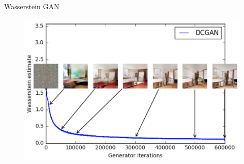 \begin{frame}{Wasserstein GAN}
\begin{minipage}[t]{0.5\columnwidth}
\begin{figure}
		\end{figure}
	\end{minipage}%
	\begin{minipage}[t]{0.5\columnwidth}
		\begin{figure}
			\centering
			\includegraphics[width=1.0\linewidth]{figs/wgan_quality}
		\end{figure}
	\end{minipage}
	
\end{frame}
